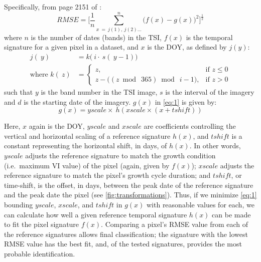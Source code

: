 Specifically, from page 2151 of \textcite{sakamoto2010a-two-step}:
\begin{equation}
\label{eq:1}
  RMSE = \biggl[\frac{1}{n}\sum_{x\ =\ j(1),\ j(2)\ldots}^{n}\bigl(f\left(x\right)-g\left(x\right)\bigr)^{2}\biggr]^{\frac{1}{2}}
\end{equation}
where $n$ is the number of dates (bands) in the TSI, $f(x)$ is the temporal signature for a given pixel in a dataset, and $x$ is the DOY, as defined by $j(y)$:
\begin{subequations}
\label{eq:DOYcalc}
  \begin{align}
    j\left(~y\right) &= k\bigl(~i\cdot~s\left(~y - 1\right)\bigr) \label{eq:jofy}\\
    \text{where\ \ \ \ } k\left(~z\right) &=
    \begin{cases}
      z, & \mbox{if } z \leq 0\\
      z - \bigl(\left(z\bmod~365\right)\bmod~i-1\bigr), & \mbox{if } z > 0
    \end{cases}
    \label{eq:kofz}
  \end{align}
\end{subequations}
such that $y$ is the band number in the TSI image, $s$ is the interval of the imagery and $d$ is the starting date of the imagery. $g(x)$ in \autoref{eq:1} is given by:
\begin{equation}
\label{eq:gofx}
  g(x) = yscale\times~h\left(xscale\times(x + tshift)\right)
\end{equation}

Here, $x$ again is the DOY, $yscale$ and  $xscale$ are coefficients controlling the vertical and horizontal scaling of a reference signature $h(x)$, and $tshift$ is a constant representing the horizontal shift, in days, of $h(x)$. In other words, $yscale$ adjusts the reference signature to match the growth condition (i.e.\ maximum VI value) of the pixel (again, given by $f(x)$); $xscale$ adjusts the reference signature to match the pixel's growth cycle duration; and $tshift$, or time-shift, is the offset, in days, between the peak date of the reference signature and the peak date the pixel (see \autoref{fig:transformations}). Thus, if we minimize \autoref{eq:1} bounding $yscale$, $xscale$, and $tshift$  in $g(x)$ with reasonable values for each, we can calculate how well a given reference temporal signature $h(x)$ can be made to fit the pixel signature $f(x)$. Comparing a pixel's RMSE value from each of the reference signatures allows final classification; the signature with the lowest RMSE value has the best fit, and, of the tested signatures, provides the most probable identification.

